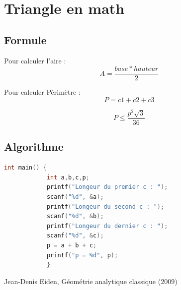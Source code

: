 \documentclass{article}
\begin{document}
\newpage
\section{Triangle en math}
    \subsection{Formule}
    \begin{center}
        Pour calculer l'aire : 
        \begin{equation*}
        A = \frac{base * hauteur}{2} 
        \end{equation*}
    \end{center}
    \begin{center}
        Pour calculer Périmètre : 
        \begin{equation*}
            P = c1 + c2 + c3
        \end{equation*}
        
        \begin{equation*}
        P \leq \frac{p^2 \sqrt{3}}{36}
        \end{equation*}
    \end{center}
    \subsection{Algorithme}
    \begin{lstlisting}[language=c]
        int main() {
            int a,b,c,p;
            printf("Longeur du premier c : ");
            scanf("%d", &a);
            printf("Longeur du second c : ");
            scanf("%d", &b);
            printf("Longeur du dernier c : ");
            scanf("%d", &c);
            p = a + b + c;
            printf("p = %d", p);
            }
    \end{lstlisting}
    \newpage
    \begin{thebibliography}{1}
        Jean-Denis Eiden, Géométrie analytique classique (2009)
    \end{thebibliography}
\end{document}
